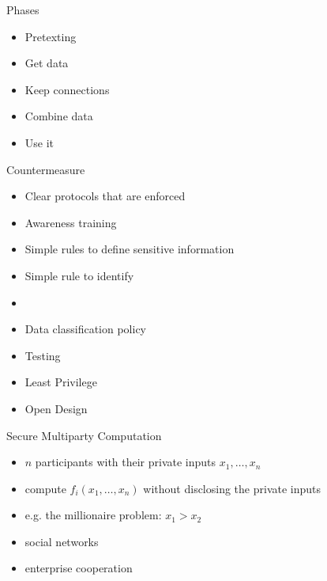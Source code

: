 \documentclass{beamer}
\begin{document}
\begin{frame}{Phases}
  \begin{itemize}
    \item Pretexting
    \item Get data
    \item Keep connections
    \item Combine data
    \item Use it
  \end{itemize}
\end{frame}

\begin{frame}{Countermeasure}
  \begin{itemize}
    \item Clear protocols that are enforced
    \item Awareness training
    \item Simple rules to define sensitive information
    \item Simple rule to identify 
    \item 
    \item Data classification policy
    \item Testing
    \item Least Privilege
    \item Open Design
  \end{itemize}
\end{frame}

\begin{frame}{Secure Multiparty Computation}
  \begin{itemize}
    \item $n$ participants with their private inputs
      $x_1,\dots,x_n$
    \item compute $f_i(x_1,\dots,x_n)$ without disclosing the private
      inputs
    \item e.g. the millionaire problem:
      $x_1 > x_2$
    \item social networks
    \item enterprise cooperation
  \end{itemize}
\end{frame}
\end{document}
